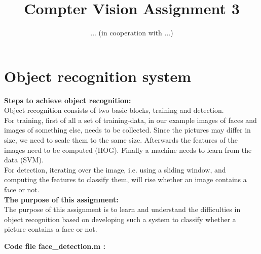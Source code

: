 \documentclass{article}
\begin{document}
	\title{Compter Vision Assignment 3}
	\author{... (in cooperation with ...)}

	\maketitle
	\vspace{1cm}
	
	\section{Object recognition system}
	\textbf{Steps to achieve object recognition:}\\
	\newline
	Object recognition consists of two basic blocks, training and detection.\\ 
	For training, first of all a set of training-data, in our example images of faces and images of something else, needs to be collected. Since the pictures may differ in size, we need to scale them to the same size. Afterwards the features of the images need to be computed (HOG). Finally a machine needs to learn from the data (SVM).\\
	For detection, iterating over the image, i.e. using a sliding window, and computing the features to classify them, will rise whether an image contains a face or not.\\
	\newline
	\textbf{The purpose of this assignment:}\\
	\newline
	The purpose of this assignment is to learn and understand the difficulties in object recognition based on developing such a system to classify whether a picture contains a face or not.
	
	
	\newpage
	\textbf{Code file face\_detection.m :}
	
	
\end{document}
